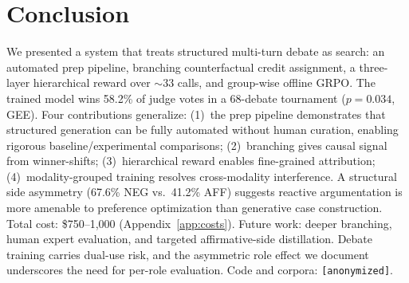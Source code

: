\section{Conclusion}
\label{sec:conclusion}

We presented a system that treats structured multi-turn debate as
search: an automated prep pipeline, branching counterfactual credit
assignment, a three-layer hierarchical reward over ${\sim}33$ calls, and
group-wise offline GRPO. The trained model wins 58.2\% of judge votes in
a 68-debate tournament ($p = 0.034$, GEE). Four contributions generalize:
(1)~the prep pipeline demonstrates that structured generation can be
fully automated without human curation, enabling rigorous
baseline/experimental comparisons; (2)~branching gives causal signal from
winner-shifts; (3)~hierarchical reward enables fine-grained attribution;
(4)~modality-grouped training resolves cross-modality interference. A
structural side asymmetry (67.6\% NEG vs.\ 41.2\% AFF) suggests reactive
argumentation is more amenable to preference optimization than generative
case construction. Total cost: \$750--1{,}000 (Appendix~\ref{app:costs}).
Future work: deeper branching, human expert evaluation, and targeted
affirmative-side distillation. Debate training carries dual-use risk, and
the asymmetric role effect we document underscores the need for
per-role evaluation. Code and corpora: \texttt{[anonymized]}.
